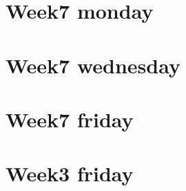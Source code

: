 \section*{Week7 monday}

\vfill
\section*{Week7 wednesday}

\vfill
\section*{Week7 friday}

\vfill
\section*{Week3 friday}

\vfill
